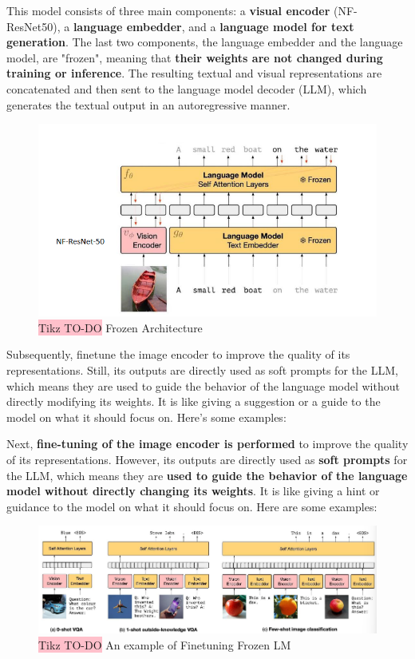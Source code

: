 This model consists of three main components: a \textbf{visual encoder} (NF-ResNet50), a \textbf{language embedder}, and a \textbf{language model for text generation}. The last two components, the language embedder and the language model, are "frozen", meaning that \textbf{their weights are not changed during training or inference}. The resulting textual and visual representations are concatenated and then sent to the language model decoder (LLM), which generates the textual output in an autoregressive manner.

\begin{figure}[!htbp]
    \centering
    \includegraphics[width=0.8\linewidth]{tikz/chapter11 - Frozen LM.png}
    \caption{{\color{red}\colorbox{pink}{Tikz TO-DO}} Frozen Architecture}
\end{figure}

Subsequently, finetune the image encoder to improve the quality of its representations. Still, its outputs are directly used as soft prompts for the LLM, which means they are used to guide the behavior of the language model without directly modifying its weights. It is like giving a suggestion or a guide to the model on what it should focus on. Here's some examples:

Next, \textbf{fine-tuning of the image encoder is performed} to improve the quality of its representations. However, its outputs are directly used as \textbf{soft prompts} for the LLM, which means they are \textbf{used to guide the behavior of the language model without directly changing its weights}. It is like giving a hint or guidance to the model on what it should focus on. Here are some examples:

\begin{figure}[!htbp]
    \centering
    \includegraphics[width=\linewidth]{tikz/chapter11 - Frozen LM Tasks.png}
    \caption{{\color{red}\colorbox{pink}{Tikz TO-DO}} An example of Finetuning Frozen LM}
\end{figure}

